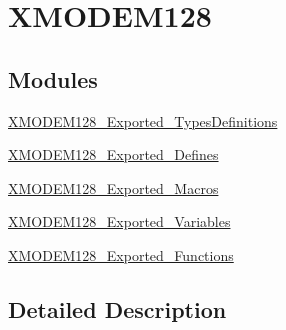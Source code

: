 \hypertarget{group___x_m_o_d_e_m128}{}\section{X\+M\+O\+D\+E\+M128}
\label{group___x_m_o_d_e_m128}
\subsection*{Modules}
\begin{DoxyCompactItemize}
\item 
\mbox{\hyperlink{group___x_m_o_d_e_m128___exported___types_definitions}{X\+M\+O\+D\+E\+M128\+\_\+\+Exported\+\_\+\+Types\+Definitions}}
\item 
\mbox{\hyperlink{group___x_m_o_d_e_m128___exported___defines}{X\+M\+O\+D\+E\+M128\+\_\+\+Exported\+\_\+\+Defines}}
\item 
\mbox{\hyperlink{group___x_m_o_d_e_m128___exported___macros}{X\+M\+O\+D\+E\+M128\+\_\+\+Exported\+\_\+\+Macros}}
\item 
\mbox{\hyperlink{group___x_m_o_d_e_m128___exported___variables}{X\+M\+O\+D\+E\+M128\+\_\+\+Exported\+\_\+\+Variables}}
\item 
\mbox{\hyperlink{group___x_m_o_d_e_m128___exported___functions}{X\+M\+O\+D\+E\+M128\+\_\+\+Exported\+\_\+\+Functions}}
\end{DoxyCompactItemize}


\subsection{Detailed Description}
